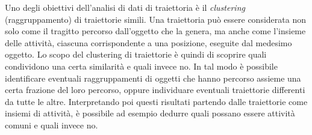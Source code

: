 Uno degli obiettivi dell'analisi di dati di traiettoria è il \textit{clustering} (raggruppamento) di traiettorie simili.
Una traiettoria può essere considerata non solo come il tragitto percorso dall'oggetto che la genera,
ma anche come l'insieme delle attività, ciascuna corrispondente a una posizione, eseguite dal medesimo oggetto.
Lo scopo del clustering di traiettorie è quindi di scoprire quali condividono una certa similarità e quali invece no.
In tal modo è possibile identificare eventuali raggruppamenti di oggetti che hanno percorso assieme una certa frazione del loro percorso, oppure individuare eventuali
traiettorie differenti da tutte le altre.
Interpretando poi questi risultati partendo dalle traiettorie come insiemi di attività, è possibile ad esempio dedurre quali possano essere attività comuni e quali invece no.
